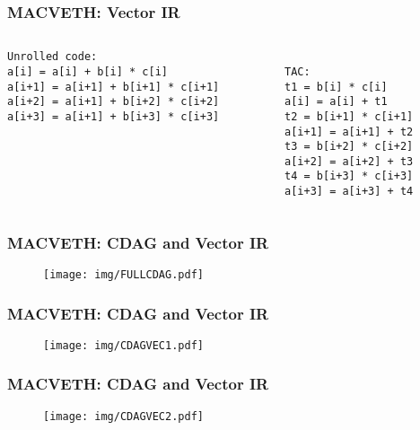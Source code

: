 \documentclass[xcolor=table,hideothersubsections,aspectratio=1610]{beamer}
\begin{document}
\begin{frame}[fragile]
\frametitle{MACVETH: Vector IR}
\begin{columns}
\begin{column}{0.5\textwidth}
\begin{verbatim}
Unrolled code:
a[i] = a[i] + b[i] * c[i]
a[i+1] = a[i+1] + b[i+1] * c[i+1]
a[i+2] = a[i+1] + b[i+2] * c[i+2]
a[i+3] = a[i+1] + b[i+3] * c[i+3]
\end{verbatim}
\end{column}
\begin{column}{0.35\textwidth}  %
\begin{verbatim}

TAC: 
t1 = b[i] * c[i]
a[i] = a[i] + t1
t2 = b[i+1] * c[i+1]
a[i+1] = a[i+1] + t2
t3 = b[i+2] * c[i+2]
a[i+2] = a[i+2] + t3
t4 = b[i+3] * c[i+3]
a[i+3] = a[i+3] + t4
\end{verbatim}

\end{column}
\end{columns}
\end{frame}

\begin{frame}[fragile]
\frametitle{MACVETH: CDAG and Vector IR}
\begin{figure}
    \centering
    \texttt{[image: img/FULLCDAG.pdf]}
\end{figure}
\end{frame}

\begin{frame}[fragile]
\frametitle{MACVETH: CDAG and Vector IR}
\begin{figure}
    \centering
    \texttt{[image: img/CDAGVEC1.pdf]}
\end{figure}
\end{frame}

\begin{frame}[fragile]
\frametitle{MACVETH: CDAG and Vector IR}
\begin{figure}
    \centering
    \texttt{[image: img/CDAGVEC2.pdf]}
\end{figure}
\end{frame}
\end{document}
